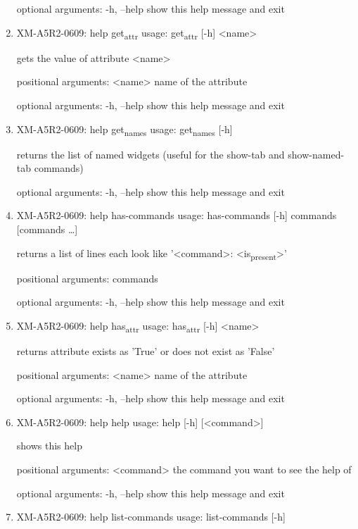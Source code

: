 \documentclass[11pt]{article}
\begin{document}
\begin{enumerate}
optional arguments:
  -h, --help  show this help message and exit

\item XM-A5R2-0609: help get\textsubscript{attr}
\label{sec:org9408064}
usage: get\textsubscript{attr} [-h] <name>

gets the value of attribute <name>

positional arguments:
  <name>      name of the attribute

optional arguments:
  -h, --help  show this help message and exit

\item XM-A5R2-0609: help get\textsubscript{names}
\label{sec:org2e2facc}
usage: get\textsubscript{names} [-h]

returns the list of named widgets (useful for the show-tab and show-named-tab
commands)

optional arguments:
  -h, --help  show this help message and exit

\item XM-A5R2-0609: help has-commands
\label{sec:org62101ef}
usage: has-commands [-h] commands [commands \ldots{}]

returns a list of lines each look like '<command>: <is\textsubscript{present}>'

positional arguments:
  commands

optional arguments:
  -h, --help  show this help message and exit

\item XM-A5R2-0609: help has\textsubscript{attr}
\label{sec:orgd83bf98}
usage: has\textsubscript{attr} [-h] <name>

returns attribute exists as 'True' or does not exist as 'False'

positional arguments:
  <name>      name of the attribute

optional arguments:
  -h, --help  show this help message and exit

\item XM-A5R2-0609: help help
\label{sec:org0aab75e}
usage: help [-h] [<command>]

shows this help

positional arguments:
  <command>   the command you want to see the help of

optional arguments:
  -h, --help  show this help message and exit

\item XM-A5R2-0609: help list-commands
\label{sec:orgc26fbbf}
usage: list-commands [-h]


\end{enumerate}
\end{document}
